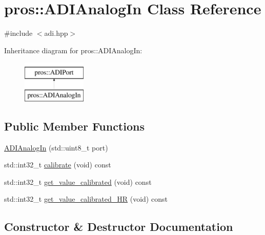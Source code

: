 \hypertarget{classpros_1_1ADIAnalogIn}{}\section{pros\+:\+:A\+D\+I\+Analog\+In Class Reference}
\label{classpros_1_1ADIAnalogIn}


{\ttfamily \#include $<$adi.\+hpp$>$}

Inheritance diagram for pros\+:\+:A\+D\+I\+Analog\+In\+:\begin{figure}[H]
\begin{center}
\leavevmode
\includegraphics[height=2.000000cm]{classpros_1_1ADIAnalogIn}
\end{center}
\end{figure}
\subsection*{Public Member Functions}
\begin{DoxyCompactItemize}
\item 
\hyperlink{classpros_1_1ADIAnalogIn_aeac81958e7ba33ee9693ab843f5b55ed}{A\+D\+I\+Analog\+In} (std\+::uint8\+\_\+t port)
\item 
std\+::int32\+\_\+t \hyperlink{classpros_1_1ADIAnalogIn_ac8dd1e625cbcec4951d20be0c0fa2d3c}{calibrate} (void) const
\item 
std\+::int32\+\_\+t \hyperlink{classpros_1_1ADIAnalogIn_a5930ce87c880833bda8cd202613b8d80}{get\+\_\+value\+\_\+calibrated} (void) const
\item 
std\+::int32\+\_\+t \hyperlink{classpros_1_1ADIAnalogIn_a65bfed175ed1b0efce4566e78e7f9473}{get\+\_\+value\+\_\+calibrated\+\_\+\+HR} (void) const
\end{DoxyCompactItemize}


\subsection{Constructor \& Destructor Documentation}
\mbox{\label{classpros_1_1ADIAnalogIn_aeac81958e7ba33ee9693ab843f5b55ed}} 
